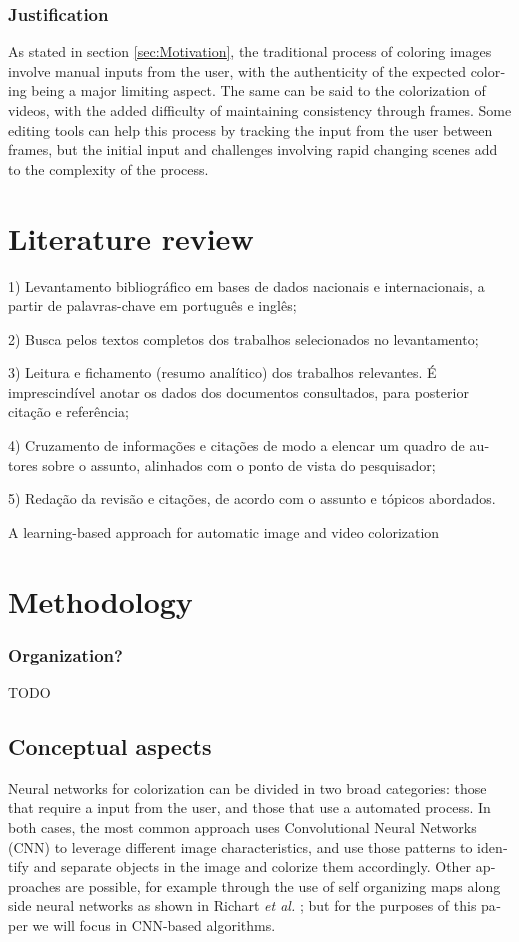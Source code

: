 \documentclass[12pt,openright,twoside,a4paper,english]{abntex2}
\begin{document}
\begin{otherlanguage}{english}
\subsection{Justification}
As stated in section \ref{sec:Motivation}, the traditional process of coloring images involve manual inputs from the user, with the authenticity of the expected coloring being a major limiting aspect.
The same can be said to the colorization of videos, with the added difficulty of maintaining consistency through frames. Some editing tools can help this process by tracking the input from the user between frames, but the initial input and challenges involving rapid changing scenes add to the complexity of the process.

\chapter{Literature review}

1) Levantamento bibliográfico em bases de dados nacionais e internacionais, a
partir de palavras-chave em português e inglês;

2) Busca pelos textos completos dos trabalhos selecionados no levantamento;

3) Leitura e fichamento (resumo analítico) dos trabalhos relevantes. É imprescindível anotar os dados dos documentos consultados, para posterior citação e referência;

4) Cruzamento de informações e citações de modo a elencar um quadro de autores sobre o assunto, alinhados com o ponto de vista do pesquisador;

5) Redação da revisão e citações, de acordo com o assunto e tópicos abordados.

A learning-based approach for automatic image and video colorization

\chapter{Methodology}
\subsection{Organization?}
TODO

\section{Conceptual aspects} \label{sec:Concept}
Neural networks for colorization can be divided in two broad categories: those that require a input from the user, and those that use a automated process. In both cases, the most common approach uses Convolutional Neural Networks (CNN) to leverage different image characteristics, and use those patterns to identify and separate objects in the image and colorize them accordingly. Other approaches are possible, for example through the use of self organizing maps along side neural networks as shown in Richart \textit{et al.} \cite{Richart_som_nn}; but for the purposes of this paper we will focus in CNN-based algorithms.


\end{otherlanguage}
\end{document}
